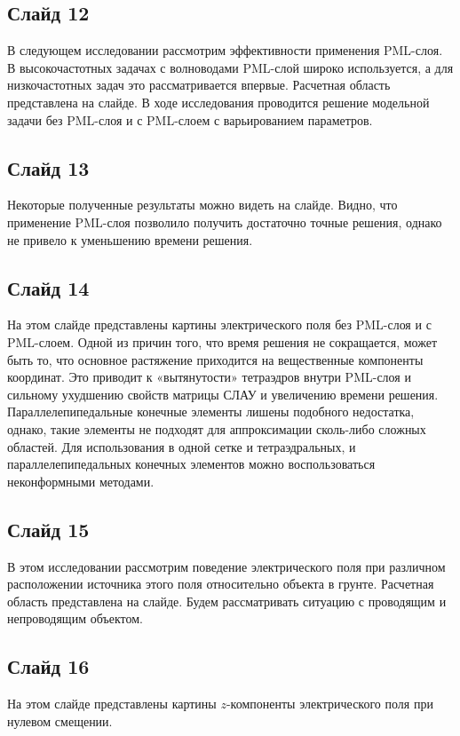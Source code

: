 \documentclass[a4paper,10pt]{article}
\begin{document}
\subsection*{Слайд 12}
В следующем исследовании рассмотрим эффективности применения PML-слоя. В высокочастотных задачах с волноводами PML-слой широко используется, а для низкочастотных задач это рассматривается впервые. Расчетная область представлена на слайде. В ходе исследования проводится решение модельной задачи без PML-слоя и с PML-слоем с варьированием параметров.

\subsection*{Слайд 13}
Некоторые полученные результаты можно видеть на слайде. Видно, что применение PML-слоя позволило получить достаточно точные решения, однако не привело к уменьшению времени решения.

\subsection*{Слайд 14}
На этом слайде представлены картины электрического поля без PML-слоя и с PML-слоем. Одной из причин того, что время решения не сокращается, может быть то, что основное растяжение приходится на вещественные компоненты координат. Это приводит к «вытянутости» тетраэдров внутри PML-слоя и сильному ухудшению свойств матрицы СЛАУ и увеличению времени решения. Параллелепипедальные конечные элементы лишены подобного недостатка, однако, такие элементы не подходят для аппроксимации сколь-либо сложных областей. Для использования в одной сетке и тетраэдральных, и параллелепипедальных конечных элементов можно воспользоваться неконформными методами.

\subsection*{Слайд 15}
В этом исследовании рассмотрим поведение электрического поля при различном расположении источника этого поля относительно объекта в грунте. Расчетная область представлена на слайде. Будем рассматривать ситуацию с проводящим и непроводящим объектом.

\subsection*{Слайд 16}
На этом слайде представлены картины $z$-компоненты электрического поля при нулевом смещении.
\end{document}
